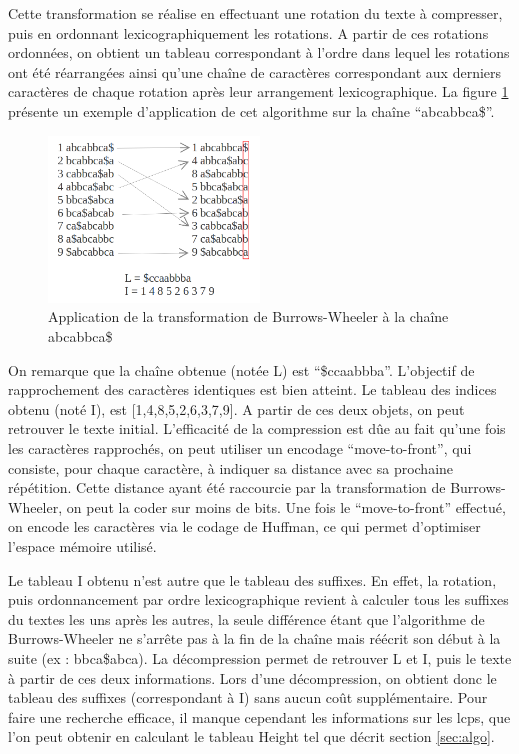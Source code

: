 \documentclass[a4paper,10pt]{article}
\begin{document}
Cette transformation se réalise en effectuant une rotation du texte à
compresser, puis en ordonnant lexicographiquement les rotations. A
partir de ces rotations ordonnées, on obtient un tableau correspondant
à l'ordre dans lequel les rotations ont été réarrangées ainsi qu'une
chaîne de caractères correspondant aux derniers caractères de chaque
rotation après leur arrangement lexicographique. La figure
\ref{fig:burrows} présente un exemple d'application de cet algorithme
sur la chaîne ``abcabbca\$''. 

\begin{figure}
  \centering
  \includegraphics[width=0.5\textwidth]{full_burrows}
  \caption{Application de la transformation de Burrows-Wheeler à la
    chaîne abcabbca\$}
  \label{fig:burrows}
\end{figure}


On remarque que la chaîne obtenue (notée L) est
``\$ccaabbba''. L'objectif de rapprochement des caractères identiques
est bien atteint. Le tableau des indices obtenu (noté I), est
[1,4,8,5,2,6,3,7,9]. A partir de ces deux objets, on peut retrouver le
texte initial. L'efficacité de la compression est dûe au fait qu'une
fois les caractères rapprochés, on peut utiliser un encodage
``move-to-front'', qui consiste, pour chaque caractère, à indiquer sa
distance avec sa prochaine répétition. Cette distance ayant été
raccourcie par la transformation de Burrows-Wheeler, on peut la coder
sur moins de bits. Une fois le ``move-to-front'' effectué, on encode
les caractères via le codage de Huffman, ce qui permet d'optimiser
l'espace mémoire utilisé.

Le tableau I obtenu n'est autre que le tableau des suffixes. En effet,
la rotation, puis ordonnancement par ordre lexicographique revient à
calculer tous les suffixes du textes les uns après les autres, la
seule différence étant que l'algorithme de Burrows-Wheeler ne s'arrête
pas à la fin de la chaîne mais réécrit son début à la suite (ex :
bbca\$abca). La décompression permet de retrouver L et I, puis le
texte à partir de ces deux informations. Lors d'une décompression, on
obtient donc le tableau des suffixes (correspondant à I) sans aucun
coût supplémentaire. Pour faire une recherche efficace, il manque
cependant les informations sur les lcps, que l'on peut obtenir en
calculant le tableau Height tel que décrit section \ref{sec:algo}.
\end{document}
